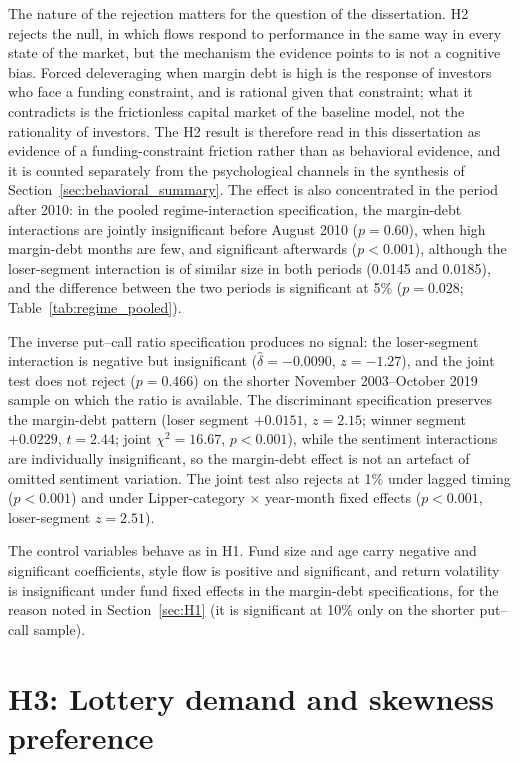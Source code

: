 \documentclass[12pt, oneside]{report}
\begin{document}
The nature of the rejection matters for the question of the
dissertation. H2 rejects the \textcite{BerkGreen2004} null, in which flows
respond to performance in the same way in every state of the market, but
the mechanism the evidence points to is not a cognitive bias. Forced
deleveraging when margin debt is high is the response of investors who
face a funding constraint, and is rational given that constraint; what
it contradicts is the frictionless capital market of the baseline model,
not the rationality of investors. The H2 result is therefore read in
this dissertation as evidence of a funding-constraint friction rather
than as behavioral evidence, and it is counted separately from the
psychological channels in the synthesis of
Section~\ref{sec:behavioral_summary}. The effect is also concentrated in
the period after 2010: in the pooled regime-interaction specification,
the margin-debt interactions are jointly insignificant before August 2010
($p = 0.60$), when high margin-debt months are few, and significant
afterwards ($p < 0.001$), although the loser-segment interaction is of
similar size in both periods (0.0145 and 0.0185), and the difference
between the two periods is significant at 5\%
($p = 0.028$; Table~\ref{tab:regime_pooled}).

The inverse put--call ratio specification produces no signal: the
loser-segment interaction is negative but insignificant
($\hat{\delta} = -0.0090$, $z = -1.27$), and the joint test does not
reject ($p = 0.466$) on the shorter November 2003--October 2019 sample on
which the ratio is available. The discriminant specification preserves
the margin-debt pattern (loser segment $+0.0151$, $z = 2.15$; winner
segment $+0.0229$, $t = 2.44$; joint $\chi^2 = 16.67$, $p < 0.001$), while
the sentiment interactions are individually insignificant, so the
margin-debt effect is not an artefact of omitted sentiment variation.
The joint test also rejects at 1\% under lagged timing ($p < 0.001$) and
under Lipper-category $\times$ year-month fixed effects ($p < 0.001$,
loser-segment $z = 2.51$).

The control variables behave as in H1. Fund size and age carry negative
and significant coefficients, style flow is positive and significant,
and return volatility is insignificant under fund fixed effects in the
margin-debt specifications, for the reason noted in Section~\ref{sec:H1}
(it is significant at 10\% only on the shorter put--call sample).

\section{H3: Lottery demand and skewness preference}
\label{sec:H3}
\end{document}
